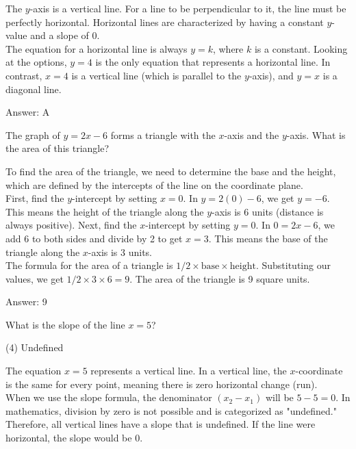 \documentclass[11pt,paper=a4,answers]{exam}
\begin{document}
\begin{questions}
\begin{solution}
The $y$-axis is a vertical line. For a line to be perpendicular to it, the line must be perfectly horizontal. Horizontal lines are characterized by having a constant $y$-value and a slope of 0.
\\[10pt]
The equation for a horizontal line is always $y = k$, where $k$ is a constant. Looking at the options, $y = 4$ is the only equation that represents a horizontal line. In contrast, $x = 4$ is a vertical line (which is parallel to the $y$-axis), and $y = x$ is a diagonal line.

\vspace{15pt}
Answer: \colorbox{yellow!100}{A}
\end{solution}

\question
The graph of $y = 2x - 6$ forms a triangle with the $x$-axis and the $y$-axis. What is the area of this triangle?

\begin{solution}
To find the area of the triangle, we need to determine the base and the height, which are defined by the intercepts of the line on the coordinate plane.
\\[10pt]
First, find the $y$-intercept by setting $x = 0$. In $y = 2(0) - 6$, we get $y = -6$. This means the height of the triangle along the $y$-axis is 6 units (distance is always positive). Next, find the $x$-intercept by setting $y = 0$. In $0 = 2x - 6$, we add 6 to both sides and divide by 2 to get $x = 3$. This means the base of the triangle along the $x$-axis is 3 units.
\\[10pt]
The formula for the area of a triangle is $1/2 \times \text{base} \times \text{height}$. Substituting our values, we get $1/2 \times 3 \times 6 = 9$. The area of the triangle is 9 square units.

\vspace{15pt}
Answer: \colorbox{yellow!100}{9}
\end{solution}

\question
What is the slope of the line $x = 5$?
\begin{tasks}(4)
    \task Undefined
\end{tasks}

\begin{solution}
The equation $x = 5$ represents a vertical line. In a vertical line, the $x$-coordinate is the same for every point, meaning there is zero horizontal change (run).
\\[10pt]
When we use the slope formula, the denominator $(x_2 - x_1)$ will be $5 - 5 = 0$. In mathematics, division by zero is not possible and is categorized as "undefined." Therefore, all vertical lines have a slope that is undefined. If the line were horizontal, the slope would be 0.


\end{solution}
\end{questions}
\end{document}

